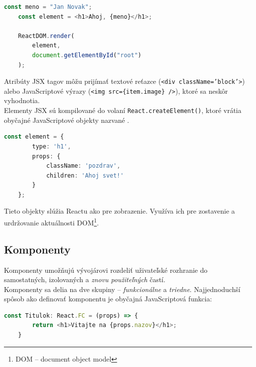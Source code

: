 \begin{lstlisting}[language=TypeScript, caption=Príklad využitia JSX v~React aplikácií. \cite{React}]
	const meno = "Jan Novak";
	const element = <h1>Ahoj, {meno}</h1>;

	ReactDOM.render(
		element,
		document.getElementById("root")
	);
\end{lstlisting}

\medskip

\noindent Atribúty JSX tagov môžu prijímať textové reťazce (\texttt{<div className='block'>}) alebo JavaScriptové výrazy (\texttt{<img src=\{item.image\} />}), ktoré sa neskôr vyhodnotia. \\

\noindent Elementy JSX sú kompilované do volaní \texttt{React.createElement()}, ktoré vrátia obyčajné JavaScriptové objekty nazvané . \cite{React} \\

\begin{lstlisting}[language=TypeScript, caption=Príklad jednoduchého React elementu po kompilácií. \cite{React}]
	const element = {
		type: 'h1',
		props: {
			className: 'pozdrav',
			children: 'Ahoj svet!'
		}
	};
\end{lstlisting}

\medskip

\noindent Tieto objekty slúžia Reactu ako  pre zobrazenie. Využíva ich pre zostavenie a urdržovanie aktuálnosti DOM\footnote{DOM -- document object model}. \cite{React}

\subsection{Komponenty}
\label{theory:components}
Komponenty umožňujú vývojárovi rozdeliť uživateľské rozhranie do samostatných, izolovaných a \emph{znovu použiteľných} častí. \cite{React} \\

\noindent Komponenty sa delia na dve skupiny -- \emph{funkcionálne} a \emph{triedne}. Najjednoduchší spôsob ako definovať komponentu je obyčajná JavaScriptová funkcia: \\

\begin{lstlisting}[language=TypeScript, caption=Príklad definície funkcionálnej komponenty.]
	const Titulok: React.FC = (props) => {
		return <h1>Vitajte na {props.nazov}</h1>;
	}
\end{lstlisting}


